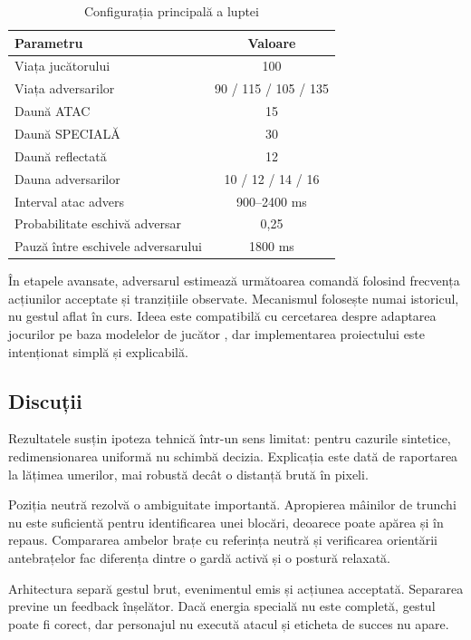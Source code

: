 \documentclass[12pt, a4paper]{article}
\begin{document}
\begin{table}[H]
    \centering
    \caption{Configurația principală a luptei}
    \label{tab:config}
    \begin{tabular}{lc}
        \toprule
        \textbf{Parametru} & \textbf{Valoare} \\
        \midrule
        Viața jucătorului & 100 \\
        Viața adversarilor & 90 / 115 / 105 / 135 \\
        Daună ATAC & 15 \\
        Daună SPECIALĂ & 30 \\
        Daună reflectată & 12 \\
        Dauna adversarilor & 10 / 12 / 14 / 16 \\
        Interval atac advers & 900--2400 ms \\
        Probabilitate eschivă adversar & 0,25 \\
        Pauză între eschivele adversarului & 1800 ms \\
        \bottomrule
    \end{tabular}
\end{table}

În etapele avansate, adversarul estimează următoarea comandă folosind frecvența
acțiunilor acceptate și tranzițiile observate. Mecanismul folosește numai istoricul,
nu gestul aflat în curs. Ideea este compatibilă cu cercetarea despre adaptarea
jocurilor pe baza modelelor de jucător \parencite{yannakakis2009,cowley2016}, dar
implementarea proiectului este intenționat simplă și explicabilă.

\subsection{Discuții}

Rezultatele susțin ipoteza tehnică într-un sens limitat: pentru cazurile sintetice,
redimensionarea uniformă nu schimbă decizia. Explicația este dată de raportarea la
lățimea umerilor, mai robustă decât o distanță brută în pixeli.

Poziția neutră rezolvă o ambiguitate importantă. Apropierea mâinilor de trunchi nu
este suficientă pentru identificarea unei blocări, deoarece poate apărea și în repaus.
Compararea ambelor brațe cu referința neutră și verificarea orientării antebrațelor
fac diferența dintre o gardă activă și o postură relaxată.

Arhitectura separă gestul brut, evenimentul emis și acțiunea acceptată. Separarea
previne un feedback înșelător. Dacă energia specială nu este completă, gestul poate
fi corect, dar personajul nu execută atacul și eticheta de succes nu apare.
\end{document}

